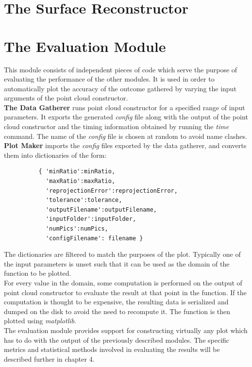 \documentclass[12pt,a4paper,twoside,openright]{report}
\begin{document}
\section{The Surface Reconstructor}


\section{The Evaluation Module}
This module consists of independent pieces of code which serve the purpose of evaluating the performance of the other modules. It is used in order to automatically plot the accuracy of the outcome gathered by varying the input arguments of the point cloud constructor.\\
\linebreak
\textbf{The Data Gatherer} runs point cloud constructor for a specified range of input parameters. It exports the generated \emph{config} file along with the output of the point cloud constructor and the timing information obtained by running the \emph{time} command. The name of the \emph{config} file is chosen at random to avoid name clashes.\\
\linebreak
\textbf{Plot Maker} imports the \emph{config} files exported by the data gatherer, and converts them into dictionaries of the form: \begin{verbatim}    
          { 'minRatio':minRatio,
            'maxRatio':maxRatio,
            'reprojectionError':reprojectionError,
            'tolerance':tolerance,
            'outputFilename':outputFilename,
            'inputFolder':inputFolder,
            'numPics':numPics,
            'configFilename': filename }
\end{verbatim}
The dictionaries are filtered to match the purposes of the plot. Typically one of the input parameters is unset such that it can be used as the domain of the function to be plotted.\\
For every value in the domain, some computation is performed on the output of point cloud constructor to evaluate the result at that point in the function. If the computation is thought to be expensive, the resulting data is serialized and dumped on the disk to avoid the need to recompute it. The function is then plotted using \emph{matplotlib}.\\
\linebreak
The evaluation module provides support for constructing virtually any plot which has to do with the output of the previously described modules. The specific metrics and statistical methods involved in evaluating the results will be described further in chapter 4. 
\end{document}
